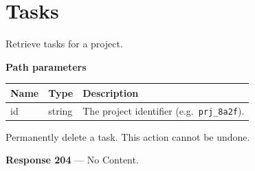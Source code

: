 \section{Tasks}

\begin{apicard}{\quad{}}
Retrieve tasks for a project.

\vspace{3pt}\textbf{Path parameters}

\begin{tabularx}{\linewidth}{@{}l l X@{}}
\toprule
\textbf{Name} & \textbf{Type} & \textbf{Description}\\
\midrule
\ttfamily id & string & The project identifier (e.g.\ \texttt{prj\_8a2f}).\\
\bottomrule
\end{tabularx}
\end{apicard}

\vspace{6pt}
\begin{apicard}{\quad{}}
Permanently delete a task. This action cannot be undone.

\vspace{4pt}\textbf{Response 204} --- No Content.
\end{apicard}

